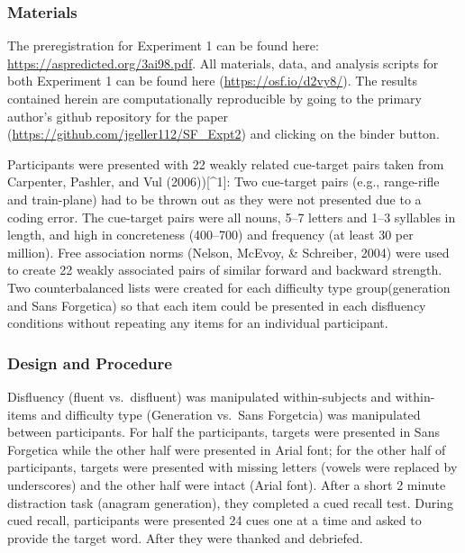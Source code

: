\documentclass[english,pdf]{apa6}
\begin{document}
\hypertarget{materials}{%
\subsubsection{Materials}\label{materials}}

The preregistration for Experiment 1 can be found here: \url{https://aspredicted.org/3ai98.pdf}. All materials, data, and analysis scripts for both Experiment 1 can be found here (\url{https://osf.io/d2vy8/}). The results contained herein are computationally reproducible by going to the primary author's github repository for the paper (\url{https://github.com/jgeller112/SF_Expt2}) and clicking on the binder button.

Participants were presented with 22 weakly related cue-target pairs taken from Carpenter, Pashler, and Vul (2006)){[}\^{}1{]}: Two cue-target pairs (e.g., range-rifle and train-plane) had to be thrown out as they were not presented due to a coding error. The cue-target pairs were all nouns, 5--7 letters and 1--3 syllables in length, and high in concreteness (400--700) and frequency (at least 30 per million). Free association norms (Nelson, McEvoy, \& Schreiber, 2004) were used to create 22 weakly associated pairs of similar forward and backward strength. Two counterbalanced lists were created for each difficulty type group(generation and Sans Forgetica) so that each item could be presented in each disfluency conditions without repeating any items for an individual participant.

\hypertarget{design-and-procedure}{%
\subsubsection{Design and Procedure}\label{design-and-procedure}}

Disfluency (fluent vs.~disfluent) was manipulated within-subjects and within-items and difficulty type (Generation vs.~Sans Forgetcia) was manipulated between participants. For half the participants, targets were presented in Sans Forgetica while the other half were presented in Arial font; for the other half of participants, targets were presented with missing letters (vowels were replaced by underscores) and the other half were intact (Arial font). After a short 2 minute distraction task (anagram generation), they completed a cued recall test. During cued recall, participants were presented 24 cues one at a time and asked to provide the target word. After they were thanked and debriefed.
\end{document}
